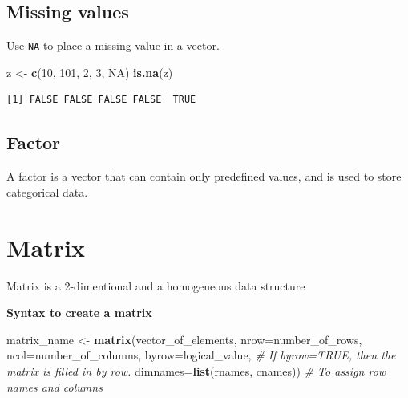\documentclass[
]{book}
\newenvironment{Shaded}{\begin{snugshade}}{\end{snugshade}}
\newcommand{\CommentTok}[1]{\textcolor[rgb]{0.56,0.35,0.01}{\textit{#1}}}
\newcommand{\DataTypeTok}[1]{\textcolor[rgb]{0.13,0.29,0.53}{#1}}
\newcommand{\DecValTok}[1]{\textcolor[rgb]{0.00,0.00,0.81}{#1}}
\newcommand{\KeywordTok}[1]{\textcolor[rgb]{0.13,0.29,0.53}{\textbf{#1}}}
\newcommand{\NormalTok}[1]{#1}
\newcommand{\OtherTok}[1]{\textcolor[rgb]{0.56,0.35,0.01}{#1}}
\newcommand{\StringTok}[1]{\textcolor[rgb]{0.31,0.60,0.02}{#1}}
\begin{document}
\hypertarget{missing-values}{%
\subsection{Missing values}\label{missing-values}}

Use \texttt{NA} to place a missing value in a vector.

\begin{Shaded}
\begin{Highlighting}[]
\NormalTok{z <-}\StringTok{ }\KeywordTok{c}\NormalTok{(}\DecValTok{10}\NormalTok{, }\DecValTok{101}\NormalTok{, }\DecValTok{2}\NormalTok{, }\DecValTok{3}\NormalTok{, }\OtherTok{NA}\NormalTok{)}
\KeywordTok{is.na}\NormalTok{(z)}
\end{Highlighting}
\end{Shaded}

\begin{verbatim}
[1] FALSE FALSE FALSE FALSE  TRUE
\end{verbatim}

\hypertarget{factor}{%
\subsection{Factor}\label{factor}}

A factor is a vector that can contain only predefined values, and is used to store categorical data.

\hypertarget{matrix}{%
\section{Matrix}\label{matrix}}

Matrix is a 2-dimentional and a homogeneous data structure

\textbf{Syntax to create a matrix}

\begin{Shaded}
\begin{Highlighting}[]
\NormalTok{matrix_name <-}\StringTok{ }\KeywordTok{matrix}\NormalTok{(vector_of_elements, }
                      \DataTypeTok{nrow=}\NormalTok{number_of_rows,}
                      \DataTypeTok{ncol=}\NormalTok{number_of_columns,}
                      \DataTypeTok{byrow=}\NormalTok{logical_value, }\CommentTok{# If byrow=TRUE, then the matrix is filled in by row.}
                      \DataTypeTok{dimnames=}\KeywordTok{list}\NormalTok{(rnames, cnames)) }\CommentTok{# To assign row names and columns}
\end{Highlighting}
\end{Shaded}
\end{document}
